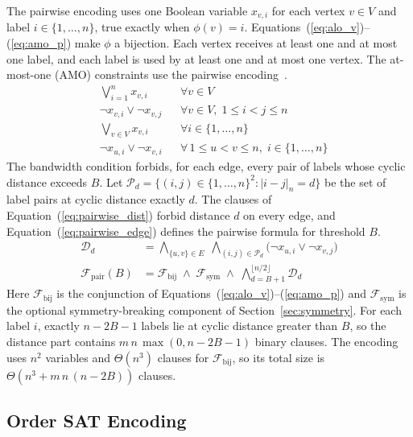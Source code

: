 \documentclass[a4paper,fleqn]{cas-sc}
\begin{document}
The pairwise encoding uses one Boolean variable $x_{v,i}$ for each vertex $v\in V$ and label $i\in\{1,\dots,n\}$, true exactly when $\phi(v)=i$. Equations~(\ref{eq:alo_v})--(\ref{eq:amo_p}) make $\phi$ a bijection. Each vertex receives at least one and at most one label, and each label is used by at least one and at most one vertex. The at-most-one (AMO) constraints use the pairwise encoding~\citep{prestwich2009}.
\begin{align}
    & \textstyle\bigvee_{i=1}^{n}x_{v,i} && \forall v\in V \label{eq:alo_v}\\
    & \neg x_{v,i}\lor\neg x_{v,j} && \forall v\in V,\;1\le i<j\le n \label{eq:amo_v}\\
    & \textstyle\bigvee_{v\in V}x_{v,i} && \forall i\in\{1,\dots,n\} \label{eq:alo_p}\\
    & \neg x_{u,i}\lor\neg x_{v,i} && \forall\, 1\le u<v\le n,\;i\in\{1,\dots,n\} \label{eq:amo_p}
\end{align}
The bandwidth condition forbids, for each edge, every pair of labels whose cyclic distance exceeds $B$. Let $\mathcal{P}_d=\{(i,j)\in\{1,\dots,n\}^2 : |i-j|_n=d\}$ be the set of label pairs at cyclic distance exactly $d$. The clauses of Equation~(\ref{eq:pairwise_dist}) forbid distance $d$ on every edge, and Equation~(\ref{eq:pairwise_edge}) defines the pairwise formula for threshold $B$.
\begin{align}
    \mathcal{D}_d &= \bigwedge_{\{u,v\}\in E}\;\bigwedge_{(i,j)\in\mathcal{P}_d}\bigl(\neg x_{u,i}\lor\neg x_{v,j}\bigr) \label{eq:pairwise_dist}\\
    \mathcal{F}_{\text{pair}}(B) &= \mathcal{F}_{\text{bij}}\;\land\;\mathcal{F}_{\text{sym}}\;\land\;\bigwedge_{d=B+1}^{\lfloor n/2\rfloor}\mathcal{D}_d \label{eq:pairwise_edge}
\end{align}
Here $\mathcal{F}_{\text{bij}}$ is the conjunction of Equations~(\ref{eq:alo_v})--(\ref{eq:amo_p}) and $\mathcal{F}_{\text{sym}}$ is the optional symmetry-breaking component of Section~\ref{sec:symmetry}. For each label $i$, exactly $n-2B-1$ labels lie at cyclic distance greater than $B$, so the distance part contains $m\,n\,\max(0,n-2B-1)$ binary clauses. The encoding uses $n^2$ variables and $\Theta(n^3)$ clauses for $\mathcal{F}_{\text{bij}}$, so its total size is $\Theta(n^3+m\,n\,(n-2B))$ clauses.

\subsection{Order SAT Encoding}
\label{sec:order}
\end{document}
